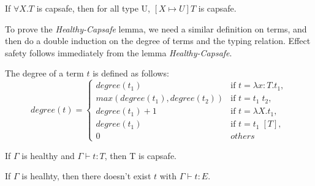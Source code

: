 
\begin{lemma}
  If $\forall X.T$ is capsafe, then for all type U, $[X \mapsto U]T$
  is capsafe.
\end{lemma}

To prove the \emph{Healthy-Capsafe} lemma, we need a similar
definition on terms, and then do a double induction on the degree of
terms and the typing relation. Effect safety follows immediately from
the lemma \emph{Healthy-Capsafe}.

\begin{definition}
  The degree of a term $t$ is defined as follows:
  \begin{equation*}
    degree(t) =
    \begin{cases}
      degree(t_1) & \text{if } t = \lambda x:T.t_1,\\
      max(degree(t_1), degree(t_2)) & \text{if } t = t_1 \; t_2,\\
      degree(t_1) + 1 & \text{if } t = \lambda X.t_1,\\
      degree(t_1) & \text{if } t = t_1 \; [T],\\
      0 & others
    \end{cases}
  \end{equation*}
\end{definition}

\begin{lemma}
  If $\Gamma$ is healthy and $\Gamma \vdash t : T$, then T is capsafe.
\end{lemma}

\begin{theorem}
  If $\Gamma$ is healhty, then there doesn't exist $t$ with
  $\Gamma \vdash t : E$.
\end{theorem}
